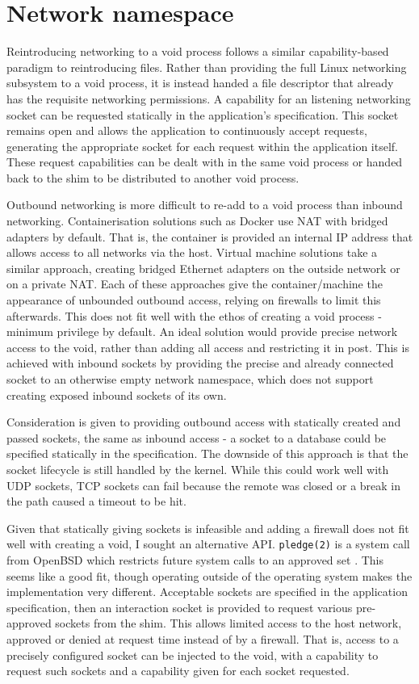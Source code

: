 \documentclass[12pt,a4paper,twoside]{report}
\begin{document}
\section{Network namespace}
\label{sec:filling-net}

Reintroducing networking to a void process follows a similar capability-based paradigm to reintroducing files. Rather than providing the full Linux networking subsystem to a void process, it is instead handed a file descriptor that already has the requisite networking permissions. A capability for an listening networking socket can be requested statically in the application's specification. This socket remains open and allows the application to continuously accept requests, generating the appropriate socket for each request within the application itself. These request capabilities can be dealt with in the same void process or handed back to the shim to be distributed to another void process.

Outbound networking is more difficult to re-add to a void process than inbound networking. Containerisation solutions such as Docker use NAT with bridged adapters by default. That is, the container is provided an internal IP address that allows access to all networks via the host. Virtual machine solutions take a similar approach, creating bridged Ethernet adapters on the outside network or on a private NAT. Each of these approaches give the container/machine the appearance of unbounded outbound access, relying on firewalls to limit this afterwards. This does not fit well with the ethos of creating a void process - minimum privilege by default. An ideal solution would provide precise network access to the void, rather than adding all access and restricting it in post. This is achieved with inbound sockets by providing the precise and already connected socket to an otherwise empty network namespace, which does not support creating exposed inbound sockets of its own.

Consideration is given to providing outbound access with statically created and passed sockets, the same as inbound access - a socket to a database could be specified statically in the specification. The downside of this approach is that the socket lifecycle is still handled by the kernel. While this could work well with UDP sockets, TCP sockets can fail because the remote was closed or a break in the path caused a timeout to be hit.

Given that statically giving sockets is infeasible and adding a firewall does not fit well with creating a void, I sought an alternative API. \texttt{pledge(2)} is a system call from OpenBSD which restricts future system calls to an approved set \citep{the_openbsd_foundation_pledge2_2022}. This seems like a good fit, though operating outside of the operating system makes the implementation very different. Acceptable sockets are specified in the application specification, then an interaction socket is provided to request various pre-approved sockets from the shim. This allows limited access to the host network, approved or denied at request time instead of by a firewall. That is, access to a precisely configured socket can be injected to the void, with a capability to request such sockets and a capability given for each socket requested.
\end{document}
